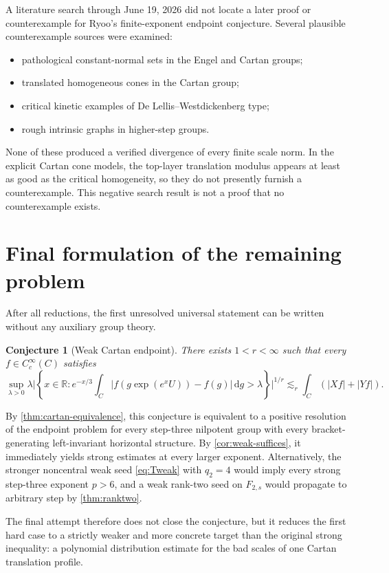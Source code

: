 \documentclass[11pt]{article}
\newtheorem{conjecture}[theorem]{Conjecture}
\theoremstyle{definition}
\theoremstyle{remark}
\newcommand{\R}{\mathbb R}
\newcommand{\dd}{\,\mathrm d}
\newcommand{\abs}[1]{\lvert #1\rvert}
\newcommand{\less}{\lesssim}
\begin{document}
A literature search through June 19, 2026 did not locate a later proof or counterexample
for Ryoo's finite-exponent endpoint conjecture.  Several plausible counterexample
sources were examined:
\begin{itemize}[leftmargin=2em]
\item pathological constant-normal sets in the Engel and Cartan groups;
\item translated homogeneous cones in the Cartan group;
\item critical kinetic examples of De Lellis--Westdickenberg type;
\item rough intrinsic graphs in higher-step groups.
\end{itemize}
None of these produced a verified divergence of every finite scale norm.  In the explicit
Cartan cone models, the top-layer translation modulus appears at least as good as the
critical homogeneity, so they do not presently furnish a counterexample.  This negative
search result is not a proof that no counterexample exists.

\section{Final formulation of the remaining problem}\label{sec:final}

After all reductions, the first unresolved universal statement can be written without any
auxiliary group theory.

\begin{conjecture}[Weak Cartan endpoint]\label{conj:weak-cartan}
There exists \(1<r<\infty\) such that every \(f\in C_c^\infty(C)\) satisfies
\[
 \sup_{\lambda>0}\lambda
 \abs{\left\{x\in\R:
 e^{-x/3}\int_C\abs{f(g\exp(e^xU))-f(g)}\dd g>\lambda
 \right\}}^{1/r}
 \less_r\int_C(\abs{Xf}+\abs{Yf}).
\]
\end{conjecture}

By \cref{thm:cartan-equivalence}, this conjecture is equivalent to a positive resolution
of the endpoint problem for every step-three nilpotent group with every bracket-generating
left-invariant horizontal structure.  By
\cref{cor:weak-suffices}, it immediately yields strong estimates at every larger
exponent.  Alternatively, the stronger noncentral weak seed \eqref{eq:Tweak} with
\(q_2=4\) would imply every strong step-three exponent \(p>6\), and a weak rank-two
seed on \(F_{2,s}\) would propagate to arbitrary step by \cref{thm:ranktwo}.

The final attempt therefore does not close the conjecture, but it reduces the first hard
case to a strictly weaker and more concrete target than the original strong inequality:
a polynomial distribution estimate for the bad scales of one Cartan translation profile.
\end{document}
